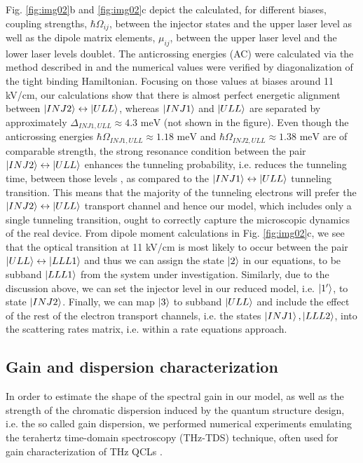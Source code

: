 \documentclass[twocolumn,secnumarabic,amssymb, nobibnotes, aps, prd]{revtex4-1}
\begin{document}
{			Fig. \ref{fig:img02}b and \ref{fig:img02}c depict the calculated, for different biases, coupling strengths, $\hbar \Omega_{ij}$, between the injector states and the upper laser level as well as the dipole matrix elements, $\mu_{ij}$, between the upper laser level and the lower laser levels doublet. The anticrossing energies (AC) were calculated via the method described in \cite{bastardwave} and the numerical values were verified by diagonalization of the tight binding Hamiltonian. Focusing on those values at biases around 11 kV/cm, our calculations show that there is almost perfect energetic alignment between $\Ket{INJ2} \leftrightarrow \Ket{ULL}$, whereas $\Ket{INJ1}$ and $\Ket{ULL}$ are separated by approximately $\Delta_{INJ1,ULL} \approx 4.3 \text{ meV}$ (not shown in the figure). Even though the anticrossing energies $\hbar \Omega_{INJ1,ULL} \approx 1.18 \text{ meV}$ and $\hbar \Omega_{INJ2,ULL} \approx 1.38 \text{ meV}$ are of comparable strength, the strong resonance condition between the pair $\Ket{INJ2} \leftrightarrow \Ket{ULL}$ enhances the tunneling probability, i.e. reduces the tunneling time, between those levels \cite{williams2007terahertz}, as compared to the $\Ket{INJ1} \leftrightarrow \Ket{ULL}$ tunneling transition. This means that the majority of the tunneling electrons will prefer the $\Ket{INJ2} \leftrightarrow \Ket{ULL}$ transport channel and hence our model, which includes only a single tunneling transition, ought to correctly capture the microscopic dynamics of the real device. From dipole moment calculations in Fig. \ref{fig:img02}c, we see that the optical transition at 11 kV/cm is most likely to occur between the pair $\Ket{ULL} \leftrightarrow \Ket{LLL1}$ and thus we can assign the state $\Ket{2}$ in our equations, to be subband $\Ket{LLL1}$ from the system under investigation. Similarly, due to the discussion above, we can set the injector level in our reduced model, i.e. $\Ket{1'}$, to state $\Ket{INJ2}$. Finally, we can map $\Ket{3}$ to subband $\Ket{ULL}$ and include the effect of the rest of the electron transport channels, i.e. the states $\Ket{INJ1},\Ket{LLL2}$, into the scattering rates matrix, i.e. within a rate equations approach.
			
			\subsection{Gain and dispersion characterization}
			\label{subsec:numthztds}
			In order to estimate the shape of the spectral gain in our model, as well as the strength of the chromatic dispersion induced by the quantum structure design, i.e. the so called gain dispersion, we performed numerical experiments emulating the terahertz time-domain spectroscopy (THz-TDS) technique, often used for gain characterization of THz QCLs \cite{burghoff2014broadband,jukam2008gain}.
			
}
\end{document}
